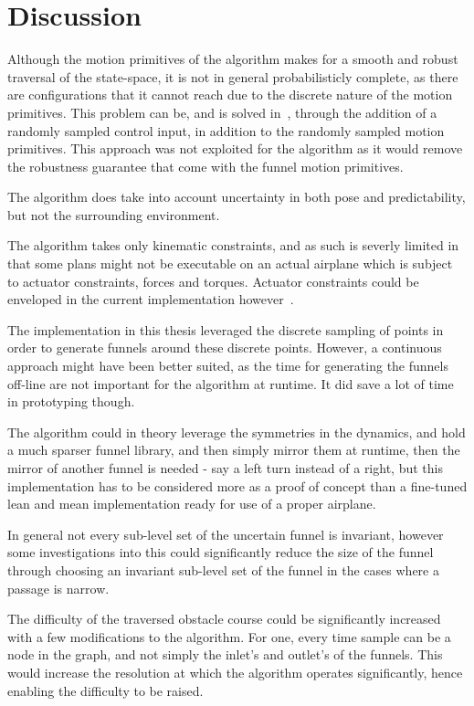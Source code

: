 \chapter{Discussion}
\label{chp:discussion}

Although the motion primitives of the \rrtfunnel{} algorithm makes for a smooth
and robust traversal of the state-space, it is not in general probabilisticly
complete, as there are configurations that it cannot reach due to the discrete
nature of the motion primitives. This problem can be, and is solved
in~\cite{vonasekGlobalMotionPlanning2013}, through the addition of a randomly
sampled control input, in addition to the randomly sampled motion primitives.
This approach was not exploited for the \rrtfunnel{} algorithm as it would
remove the robustness guarantee that come with the funnel motion primitives.

The algorithm does take into account uncertainty in both pose and
predictability, but not the surrounding environment.

The algorithm takes only kinematic constraints, and as such is severly limited
in that some plans might not be executable on an actual airplane which is
subject to actuator constraints, forces and torques. Actuator constraints could
be enveloped in the current implementation
however~\cite{majumdarFunnelLibrariesRealtime2017}.

The implementation in this thesis leveraged the discrete sampling of points in
order to generate funnels around these discrete points. However, a continuous
approach might have been better suited, as the time for generating the funnels
off-line are not important for the algorithm at runtime. It did save a lot of
time in prototyping though.

The algorithm could in theory leverage the symmetries in the dynamics, and hold
a much sparser funnel library, and then simply mirror them at runtime, then the
mirror of another funnel is needed - say a left turn instead of a right, but
this implementation has to be considered more as a proof of concept than a
fine-tuned lean and mean implementation ready for use of a proper airplane.

In general not every sub-level set of the uncertain funnel is invariant, however
some investigations into this could significantly reduce the size of the funnel
through choosing an invariant sub-level set of the funnel in the cases where a
passage is narrow.

The difficulty of the traversed obstacle course could be significantly increased
with a few modifications to the \rrtfunnel{} algorithm. For one, every time
sample can be a node in the graph, and not simply the inlet's and outlet's of
the funnels. This would increase the resolution at which the algorithm operates
significantly, hence enabling the difficulty to be raised.

